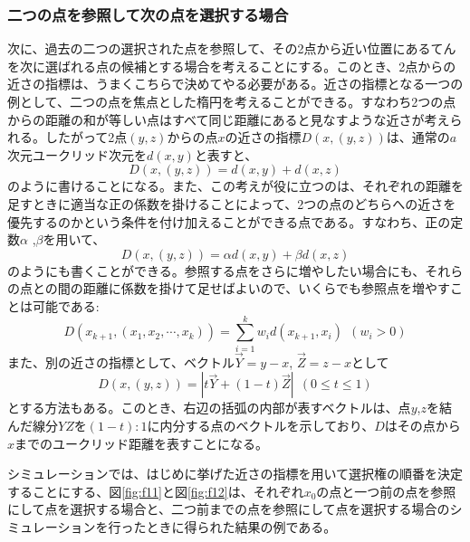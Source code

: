 \subsubsection{二つの点を参照して次の点を選択する場合}

次に、過去の二つの選択された点を参照して、その2点から近い位置にあるてんを次に選ばれる点の候補とする場合を考えることにする。このとき、2点からの近さの指標は、うまくこちらで決めてやる必要がある。近さの指標となる一つの例として、二つの点を焦点とした楕円を考えることができる。すなわち2つの点からの距離の和が等しい点はすべて同じ距離にあると見なすような近さが考えられる。したがって2点$(y, z)$からの点$x$の近さの指標$D(x, (y, z))$は、通常の$a$次元ユークリッド次元を$d(x,y)$と表すと、
$$D(x, (y, z)) = d(x,y) + d(x, z)$$
のように書けることになる。また、この考えが役に立つのは、それぞれの距離を足すときに適当な正の係数を掛けることによって、2つの点のどちらへの近さを優先するのかという条件を付け加えることができる点である。すなわち、正の定数$\alpha$ ,$\beta$を用いて、
$$D(x, (y, z)) = \alpha d(x,y) + \beta d(x, z)$$
のようにも書くことができる。参照する点をさらに増やしたい場合にも、それらの点との間の距離に係数を掛けて足せばよいので、いくらでも参照点を増やすことは可能である:
$$D(x_{k+1}, (x_{1}, x_{2}, \cdots , x_{k})) = \sum_{i=1}^{k}w_{i}d(x_{k+1}, x_{i})\ \ (w_{i} > 0)$$
また、別の近さの指標として、ベクトル$\vec{Y} = y-x$, $\vec{Z} = z-x$として
$$D(x, (y,z)) = |t\vec{Y} + (1-t)\vec{Z}|\ \ (0 \le t \le 1)$$
とする方法もある。このとき、右辺の括弧の内部が表すベクトルは、点$y$,$z$を結んだ線分$YZ$を$(1-t):1$に内分する点のベクトルを示しており、$D$はその点から$x$までのユークリッド距離を表すことになる。

シミュレーションでは、はじめに挙げた近さの指標を用いて選択権の順番を決定することにする、図\ref{fig:f11}と図\ref{fig:f12}は、それぞれ$x_{0}$の点と一つ前の点を参照にして点を選択する場合と、二つ前までの点を参照にして点を選択する場合のシミュレーションを行ったときに得られた結果の例である。

